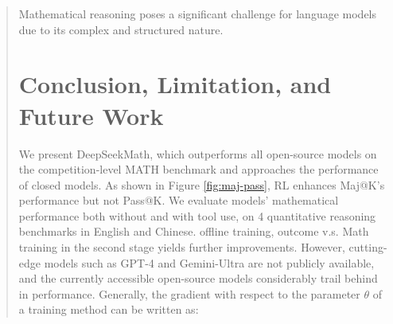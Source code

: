 \begin{itemize}[topsep=0pt]
\begin{itemize}[topsep=0pt]
\begin{itemize}[topsep=0pt]
\begin{abstract}
Mathematical reasoning poses a significant challenge for language models due to its complex and structured nature. \section{Conclusion, Limitation, and Future Work} We present DeepSeekMath, which outperforms all open-source models on the competition-level MATH benchmark and approaches the performance of closed models. As shown in Figure \ref{fig:maj-pass}, RL enhances Maj@K’s performance but not Pass@K. We evaluate models' mathematical performance both without and with tool use, on 4 quantitative reasoning benchmarks in English and Chinese. offline training, outcome v.s. Math training in the second stage yields further improvements. However, cutting-edge models such as GPT-4 \citep{gpt4} and Gemini-Ultra \citep{gemini} are not publicly available, and the currently accessible open-source models considerably trail behind in performance. Generally, the gradient with respect to the parameter $\theta$ of a training method can be written as:


\end{abstract}
\end{itemize}
\end{itemize}
\end{itemize}

